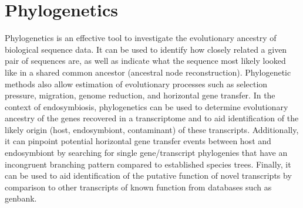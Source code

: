 %
%
% 
%
%
%







\section{Phylogenetics}


Phylogenetics is an effective tool to investigate the evolutionary ancestry of biological sequence data.
It can be used to identify how closely related a given pair of sequences are, as
well as indicate what the sequence most likely looked like in a shared common
ancestor (ancestral node reconstruction). Phylogenetic methods also allow estimation
of evolutionary processes such as selection pressure,
migration, genome reduction, and horizontal gene transfer.
In the context of endosymbiosis, phylogenetics can be used to determine evolutionary ancestry of 
the genes recovered in a transcriptome and to aid identification of the likely origin 
(host, endosymbiont, contaminant) of these transcripts. Additionally, it can pinpoint
potential horizontal gene transfer events between host and endosymbiont by searching for single 
gene/transcript phylogenies that have an incongruent branching pattern
compared to established species trees.  Finally, it can be used to aid identification of the putative function 
of novel transcripts by comparison to other transcripts of known function 
from databases such as genbank.


